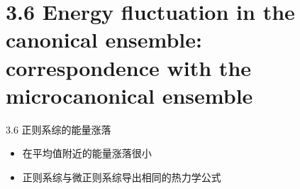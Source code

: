 \documentclass{ctexbeamer}
\begin{document}
\section{3.6 Energy fluctuation in the canonical ensemble: correspondence with the microcanonical ensemble}
\begin{frame}{3.6 正则系综的能量涨落}
    \begin{itemize}
        \item 在平均值附近的能量涨落很小
        \item 正则系综与微正则系综导出相同的热力学公式
    \end{itemize}
\end{frame}
\end{document}
